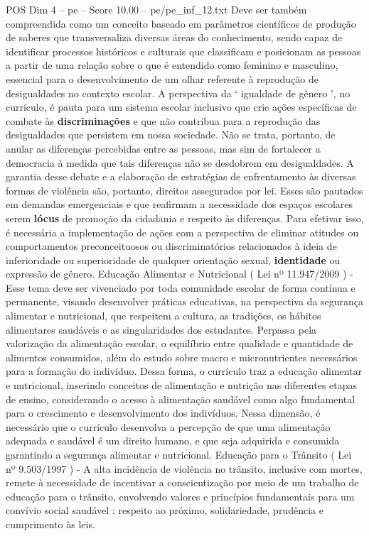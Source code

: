\begin{textsample}{POS Dim 4 – pe – Score 10.00 – pe/pe\_inf\_12.txt}
Deve ser também compreendida como um conceito baseado em parâmetros científicos de produção de saberes que transversaliza diversas áreas do conhecimento, sendo capaz de identificar processos históricos e culturais que classificam e posicionam as pessoas a partir de uma relação sobre o que é entendido como feminino e masculino, essencial para o desenvolvimento de um olhar referente à reprodução de desigualdades no contexto escolar.
A perspectiva da ‘ igualdade de gênero ’, no currículo, é pauta para um sistema escolar inclusivo que crie ações específicas de combate às \textbf{discriminações} e que não contribua para a reprodução das desigualdades que persistem em nossa sociedade.
Não se trata, portanto, de anular as diferenças percebidas entre as pessoas, mas sim de fortalecer a democracia à medida que tais diferenças não se desdobrem em desigualdades.
A garantia desse debate e a elaboração de estratégias de enfrentamento às diversas formas de violência são, portanto, direitos assegurados por lei.
Esses são pautados em demandas emergenciais e que reafirmam a necessidade dos espaços escolares serem \textbf{lócus} de promoção da cidadania e respeito às diferenças.
Para efetivar isso, é necessária a implementação de ações com a perspectiva de eliminar atitudes ou comportamentos preconceituosos ou discriminatórios relacionados à ideia de inferioridade ou superioridade de qualquer orientação sexual, \textbf{identidade} ou expressão de gênero.
Educação Alimentar e Nutricional ( Lei nº 11.947/2009 ) - Esse tema deve ser vivenciado por toda comunidade escolar de forma contínua e permanente, visando desenvolver práticas educativas, na perspectiva da segurança alimentar e nutricional, que respeitem a cultura, as tradições, os hábitos alimentares saudáveis e as singularidades dos estudantes.
Perpassa pela valorização da alimentação escolar, o equilíbrio entre qualidade e quantidade de alimentos consumidos, além do estudo sobre macro e micronutrientes necessários para a formação do indivíduo.
Dessa forma, o currículo traz a educação alimentar e nutricional, inserindo conceitos de alimentação e nutrição nas diferentes etapas de ensino, considerando o acesso à alimentação saudável como algo fundamental para o crescimento e desenvolvimento dos indivíduos.
Nessa dimensão, é necessário que o currículo desenvolva a percepção de que uma alimentação adequada e saudável é um direito humano, e que seja adquirida e consumida garantindo a segurança alimentar e nutricional.
Educação para o Trânsito ( Lei nº 9.503/1997 ) - A alta incidência de violência no trânsito, inclusive com mortes, remete à necessidade de incentivar a conscientização por meio de um trabalho de educação para o trânsito, envolvendo valores e princípios fundamentais para um convívio social saudável : respeito ao próximo, solidariedade, prudência e cumprimento às leis.

\end{textsample}
